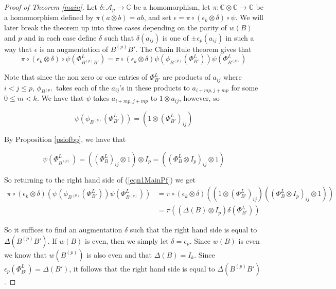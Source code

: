 \documentclass[11pt]{amsart}
\def\C{{\mathbb C}}
\def\A{{\mathcal A}}
\begin{document}
\begin{proof}[Proof of Theorem \ref{main}]
Let $\delta\colon\A_p\rightarrow \C$ be a homomorphism, let $\pi\colon \C\otimes \C \rightarrow \C$ be a homomorphism defined by $\pi(a\otimes b) = ab$, and set $\epsilon = \pi\circ(\epsilon_k\otimes\delta)\circ\psi$.  We will later break the theorem up into three cases depending on the parity of $w(B)$ and $p$ and in each case define $\delta$ such that $\delta(a_{ij})$ is one of $\pm \epsilon_p(a_{ij})$ in such a way that $\epsilon$ is an augmentation of $B^{(p)}B'$.  The Chain Rule theorem gives that
\begin{equation}
\pi\circ(\epsilon_k\otimes\delta)\circ\psi\left(\Phi_{B^{(p)}B'}^L\right) = \pi\circ(\epsilon_k\otimes\delta)\psi\left(\phi_{B^{(p)}}\left(\Phi_{B'}^L\right)\right)\psi\left(\Phi_{B^{(p)}}^L\right)
\label{eqn1MainPf}
\end{equation}

Note that since the non zero or one entries of $\Phi_{B'}^L$ are products of $a_{ij}$ where $i<j \le p$, $\phi_{B^{(p)}}$ takes each of the $a_{ij}$'s in these products to $a_{i + mp, j+mp}$ for some $0\le m<k$.  We have that $\psi$ takes $a_{i + mp, j+mp}$ to $1\otimes a_{ij}$, however, so

$$\psi\left(\phi_{B^{(p)}}\left(\Phi_{B'}^L\right)\right) = \left(1\otimes \left(\Phi_{B'}^L\right)_{ij}\right)$$

\noindent By Proposition \ref{psiofbp}, we have that 

$$\psi\left(\Phi_{B^{(p)}}^L\right) = \left(\left(\Phi_B^L\right)_{ij}\otimes 1\right)\otimes I_p = \left(\left(\Phi_B^L\otimes I_p\right)_{ij}\otimes 1\right)$$

\noindent So returning to the right hand side of (\ref{eqn1MainPf}) we get
\begin{align*}
\pi\circ(\epsilon_k\otimes\delta)\left(\psi\left(\phi_{B^{(p)}}\left(\Phi_{B'}^L\right)\right)\psi\left(\Phi_{B^{(p)}}^L\right)\right)
    & = \pi\circ(\epsilon_k\otimes\delta)\left(\left(1\otimes \left(\Phi_{B'}^L\right)_{ij}\right)\left(\left(\Phi_B^L\otimes I_p\right)_{ij}\otimes 1\right)\right)\\
    & = \pi\left(\left(\Delta(B)\otimes I_p\right)\delta\left(\Phi_{B'}^L\right)\right)
\end{align*}


So it suffices to find an augmentation $\delta$ such that the right hand side is equal to $\Delta(B^{(p)}B')$.  If $w(B)$ is even, then we simply let $\delta = \epsilon_p$.  Since $w(B)$ is even we know that $w(B^{(p)})$ is also even and that $\Delta(B) = I_k$.  Since $\epsilon_p\left(\Phi_{B'}^L\right) = \Delta(B')$, it follows that the right hand side is equal to $\Delta(B^{(p)}B')$.


\end{proof}
\end{document}
